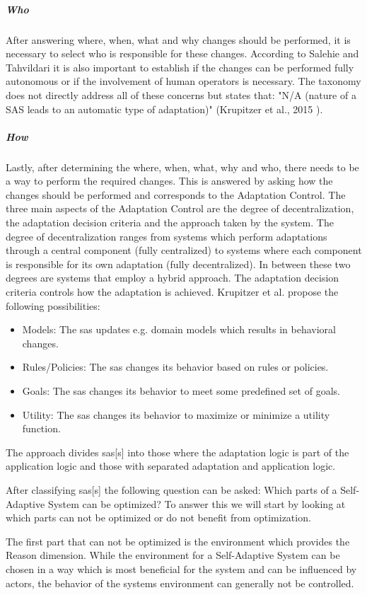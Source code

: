 \subparagraph*{Who}
After answering where, when, what and why changes should be performed, 
it is necessary to select who is responsible for these changes.
According to Salehie and Tahvildari it is also important to establish if the changes can be performed fully autonomous
or if the involvement of human operators is necessary.
The taxonomy does not directly address all of these concerns but states that:
"N/A (nature of a SAS leads to an automatic type of adaptation)" (Krupitzer et al., 2015 \cite{SurveyOnEngineeringApproaches}).

\subparagraph*{How}
Lastly, after determining the where, when, what, why and who, there needs to be a way
to perform the required changes. This is answered by asking how the changes should be performed
and corresponds to the Adaptation Control.
The three main aspects of the Adaptation Control are the degree of decentralization, the adaptation decision criteria
and the approach taken by the system.
The degree of decentralization ranges from systems which perform adaptations through a central component (fully centralized)
to systems where each component is responsible for its own adaptation (fully decentralized).
In between these two degrees are systems that employ a hybrid approach.
The adaptation decision criteria controls how the adaptation is achieved.
Krupitzer et al. propose the following possibilities:
\begin{itemize}[nosep]
    \item Models: The \acrshort{sas} updates e.g. domain models which results in behavioral changes.
    \item Rules/Policies: The \acrshort{sas} changes its behavior based on rules or policies.
    \item Goals: The \acrshort{sas} changes its behavior to meet some predefined set of goals.
    \item Utility: The \acrshort{sas} changes its behavior to maximize or minimize a utility function.
\end{itemize}
The approach divides \acrlong{sas}[s] into those where the adaptation logic is part of the application logic
and those with separated adaptation and application logic.

\noindent After classifying \acrlong{sas}[s] the following question can be asked: Which parts of a Self-Adaptive System can be optimized?
To answer this we will start by looking at which parts can not be optimized or do not benefit from optimization.

\noindent The first part that can not be optimized is the environment which provides the Reason dimension.
While the environment for a Self-Adaptive System can be chosen in a way which is most beneficial for the system
and can be influenced by actors,
the behavior of the systems environment can generally not be controlled.

